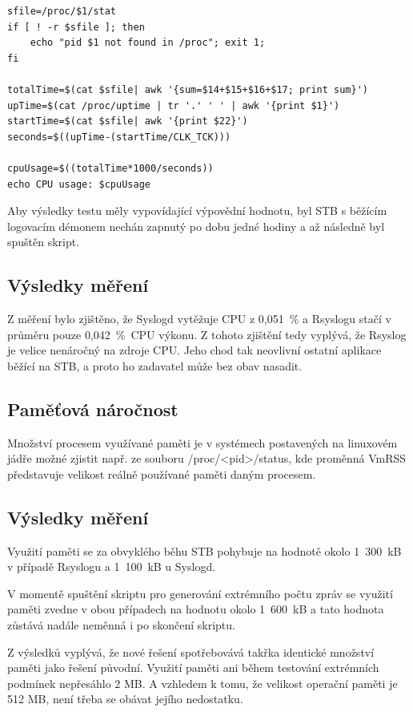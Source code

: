 \documentclass[thesis=B,czech]{FITthesis}[2012/06/26]
\begin{document}
\begin{lstlisting}[style=AshStyle]
sfile=/proc/$1/stat
if [ ! -r $sfile ]; then
    echo "pid $1 not found in /proc"; exit 1;
fi

totalTime=$(cat $sfile| awk '{sum=$14+$15+$16+$17; print sum}')
upTime=$(cat /proc/uptime | tr '.' ' ' | awk '{print $1}')
startTime=$(cat $sfile| awk '{print $22}')
seconds=$((upTime-(startTime/CLK_TCK)))

cpuUsage=$((totalTime*1000/seconds))
echo CPU usage: $cpuUsage
\end{lstlisting}
Aby výsledky testu měly vypovídající výpovědní hodnotu, byl STB s běžícím logovacím démonem nechán zapnutý po dobu jedné hodiny a až následně byl spuštěn skript.

\subsection*{Výsledky měření}
Z měření bylo zjištěno, že Syslogd vytěžuje CPU z 0,051~\% a Rsyslogu stačí v průměru pouze 0,042~\%~CPU výkonu. Z tohoto zjištění tedy vyplývá, že Rsyslog je velice nenáročný na zdroje CPU. Jeho chod tak neovlivní ostatní aplikace běžící na STB, a proto ho zadavatel může bez obav nasadit.

\subsection{Paměťová náročnost}
Množství procesem využívané paměti je v systémech postavených na linuxovém jádře možné zjistit např. ze souboru /proc/<pid>/status, kde proměnná VmRSS představuje velikost reálně používané paměti daným procesem.

\subsection*{Výsledky měření}
Využití paměti se za obvyklého běhu STB pohybuje na hodnotě okolo 1~300~kB v případě Rsyslogu a 1~100~kB u Syslogd.

V momentě spuštění skriptu pro generování extrémního počtu zpráv se využití paměti zvedne v obou případech na hodnotu okolo 1~600~kB a tato hodnota zůstává nadále neměnná i po skončení skriptu.

Z výsledků vyplývá, že nové řešení spotřebovává takřka identické množství paměti jako řešení původní. Využití paměti ani během testování extrémních podmínek nepřesáhlo 2 MB. A vzhledem k tomu, že velikost operační paměti je 512 MB, není třeba se obávat jejího nedostatku.
\end{document}
